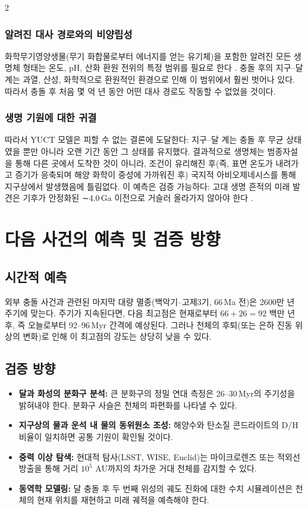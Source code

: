 \documentclass[12pt,a4paper]{article}
\begin{document}
\begin{multicols}{2}
		\subsubsection{알려진 대사 경로와의 비양립성}
		화학무기영양생물(무기 화합물로부터 에너지를 얻는 유기체)을 포함한 알려진 모든 생명체 형태는 온도, pH, 산화 환원 전위의 특정 범위를 필요로 한다 \cite{Chemolithoautotroph}. 충돌 후의 지구–달 계는 과열, 산성, 화학적으로 환원적인 환경으로 인해 이 범위에서 훨씬 벗어나 있다. 따라서 충돌 후 처음 몇 억 년 동안 어떤 대사 경로도 작동할 수 없었을 것이다.
		
		\subsubsection{생명 기원에 대한 귀결}
		따라서 YUCT 모델은 피할 수 없는 결론에 도달한다: 지구–달 계는 충돌 후 무균 상태였을 뿐만 아니라 오랜 기간 동안 그 상태를 유지했다. 결과적으로 생명체는 범종자설을 통해 다른 곳에서 도착한 것이 아니라, 조건이 유리해진 후(즉, 표면 온도가 내려가고 증기가 응축되며 해양 화학이 중성에 가까워진 후) 국지적 아비오제네시스를 통해 지구상에서 발생했음에 틀림없다. 이 예측은 검증 가능하다: 고대 생명 흔적의 미래 발견은 기후가 안정화된 ∼4.0 Ga 이전으로 거슬러 올라가지 않아야 한다 \cite{AbiogenesisReview}.
		
		\section{다음 사건의 예측 및 검증 방향}
		\subsection{시간적 예측}
		외부 충돌 사건과 관련된 마지막 대량 멸종(백악기–고제3기, 66 Ma 전)은 2600만 년 주기에 맞는다. 주기가 지속된다면, 다음 최고점은 현재로부터 \(66 + 26 = 92\) 백만 년 후, 즉 오늘로부터 92–96 Myr 간격에 예상된다. 그러나 천체의 후퇴(또는 은하 진동 위상의 변화)로 인해 이 최고점의 강도는 상당히 낮을 수 있다.
		
		\subsection{검증 방향}
		\begin{itemize}
			\item \textbf{달과 화성의 분화구 분석:} 큰 분화구의 정밀 연대 측정은 26–30 Myr의 주기성을 밝혀내야 한다. 분화구 사슬은 천체의 파편화를 나타낼 수 있다.
			\item \textbf{지구상의 물과 운석 내 물의 동위원소 조성:} 해양수와 탄소질 콘드라이트의 D/H 비율이 일치하면 공통 기원이 확인될 것이다.
			\item \textbf{중력 이상 탐색:} 현대적 탐사(LSST, WISE, Euclid)는 마이크로렌즈 또는 적외선 방출을 통해 거리 \(10^5\) AU까지의 차가운 거대 천체를 감지할 수 있다.
			\item \textbf{동역학 모델링:} 달 충돌 후 두 번째 위성의 궤도 진화에 대한 수치 시뮬레이션은 천체의 현재 위치를 재현하고 미래 궤적을 예측해야 한다.
		\end{itemize}
		

\end{multicols}
\end{document}
